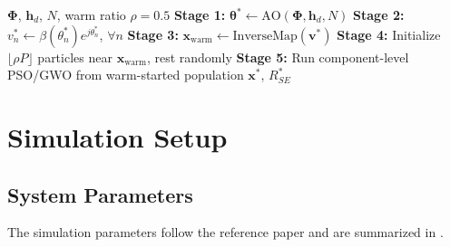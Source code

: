 \documentclass[12pt,a4paper]{article}
\newcommand{\vect}[1]{\boldsymbol{#1}}
\newcommand{\mat}[1]{\mathbf{#1}}
\begin{document}
\begin{algorithm}[htbp]
\caption{Hybrid Phase-Component Optimization}
\label{alg:hybrid}
\begin{algorithmic}[1]
    \REQUIRE $\mat{\Phi}$, $\mat{h}_d$, $N$, warm ratio $\rho = 0.5$
    \STATE \textbf{Stage 1:} $\vect{\theta}^* \leftarrow \text{AO}(\mat{\Phi}, \mat{h}_d, N)$ 
    \STATE \textbf{Stage 2:} $v_n^* \leftarrow \beta(\theta_n^*) e^{j\theta_n^*}$, $\forall n$
    \STATE \textbf{Stage 3:} $\mat{x}_{\text{warm}} \leftarrow \text{InverseMap}(\vect{v}^*)$ 
    \STATE \textbf{Stage 4:} Initialize $\lfloor \rho P \rfloor$ particles near $\mat{x}_{\text{warm}}$, rest randomly
    \STATE \textbf{Stage 5:} Run component-level PSO/GWO from warm-started population
    \RETURN $\mat{x}^*$, $R_{SE}^*$
\end{algorithmic}
\end{algorithm}


\section{Simulation Setup}
\label{sec:simulation}

\subsection{System Parameters}

The simulation parameters follow the reference paper \cite{abeywickrama2020intelligent} and are summarized in .
\end{document}
